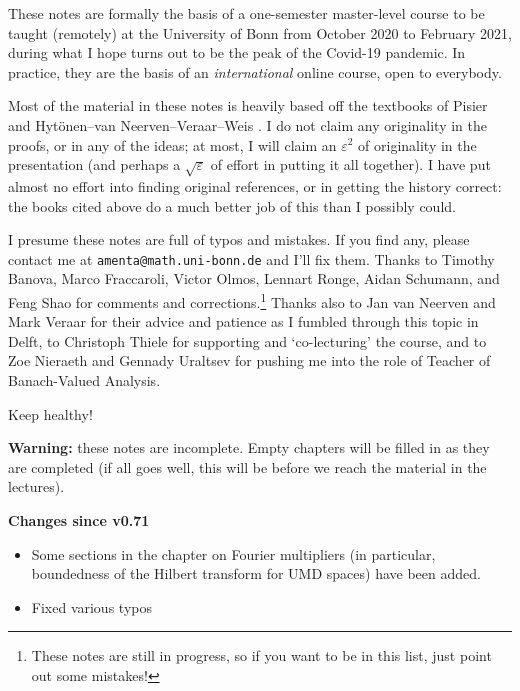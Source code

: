 These notes are formally the basis of a one-semester master-level course to be taught (remotely) at the University of Bonn from October 2020 to February 2021, during what I hope turns out to be the peak of the Covid-19 pandemic.
In practice, they are the basis of an \emph{international} online course, open to everybody.

Most of the material in these notes is heavily based off the textbooks of Pisier \cite{gP16} and Hyt\"onen--van Neerven--Veraar--Weis \cite{HNVW16, HNVW17}.
I do not claim any originality in the proofs, or in any of the ideas; at most, I will claim an $\varepsilon^2$ of originality in the presentation (and perhaps a $\sqrt{\varepsilon}$ of effort in putting it all together).
I have put almost no effort into finding original references, or in getting the history correct: the books cited above do a much better job of this than I possibly could.

\vspace{1cm}

I presume these notes are full of typos and mistakes.
If you find any, please contact me at \texttt{amenta@math.uni-bonn.de} and I'll fix them.
Thanks to Timothy Banova, Marco Fraccaroli, Victor Olmos, Lennart Ronge, Aidan Schumann, and Feng Shao for comments and corrections.\footnote{These notes are still in progress, so if you want to be in this list, just point out some mistakes!}
Thanks also to Jan van Neerven and Mark Veraar for their advice and patience as I fumbled through this topic in Delft, to Christoph Thiele for supporting and `co-lecturing' the course, and to Zoe Nieraeth and Gennady Uraltsev for pushing me into the role of Teacher of Banach-Valued Analysis.

\vspace{0.5cm}

Keep healthy! 




\vspace{1cm}

\textbf{Warning:} these notes are incomplete.
Empty chapters will be filled in as they are completed (if all goes well, this will be before we reach the material in the lectures).

\textbf{Changes since v0.71}
\begin{itemize}
\item Some sections in the chapter on Fourier multipliers (in particular, boundedness of the Hilbert transform for UMD spaces) have been added.
\item Fixed various typos
\end{itemize}

